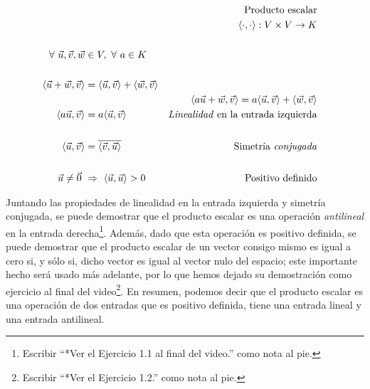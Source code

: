 \documentclass[12pt,dvipsnames]{article}
\numberwithin{equation}{section}
\begin{document}
\begin{align*}
    & &\text{Producto escalar}& &\\
    & &\langle\cdot,\cdot\rangle:V\times V\to K & &\\
    \\
    \forall \ \vec{u}, \vec{v}, \vec{w}&\in V, \ \forall \ a\in K\\
    \\
    \langle\vec{u}+\vec{w},\vec{v}\rangle &= \langle \vec{u} , \vec{v} \rangle + \langle \vec{w} , \vec{v} \rangle \\
                                          & &\langle a\vec{u}+\vec{w} , \vec{v} \rangle = a \langle \vec{u} , \vec{v} \rangle + \langle \vec{w} , \vec{v} \rangle\\
    \langle a\vec{u} , \vec{v} \rangle &= a \langle \vec{u} , \vec{v} \rangle &\text{\emph{Linealidad} en la  entrada izquierda} \\
    \\
    \langle \vec{u} , \vec{v} \rangle &= \overline{ \langle \vec{v} , \vec{u} \rangle} &\text{Simetría \emph{conjugada}}\\
    \\
    \vec{u}\neq\vec{0} \ &\Rightarrow \ \langle \vec{u}, \vec{u} \rangle > 0
 &\text{Positivo definido}
\end{align*}

\noindent Juntando las propiedades de linealidad en la entrada izquierda y simetría conjugada, se puede demostrar que el producto escalar es una operación \emph{antilineal} en la entrada derecha\footnote{Escribir ``*Ver el Ejercicio 1.1 al final del video.'' como nota al pie.}. Además, dado que esta operación es positivo definida, se puede demostrar que el producto escalar de un vector consigo mismo es igual a cero si, y sólo si, dicho vector es igual al vector nulo del espacio; este importante hecho será usado más adelante, por lo que hemos dejado su demostración como ejercicio al final del video\footnote{Escribir ``*Ver el Ejercicio 1.2.'' como nota al pie.}. En resumen, podemos decir que el producto escalar es una operación de dos entradas que es positivo definida, tiene una entrada lineal y una entrada antilineal.
\end{document}
